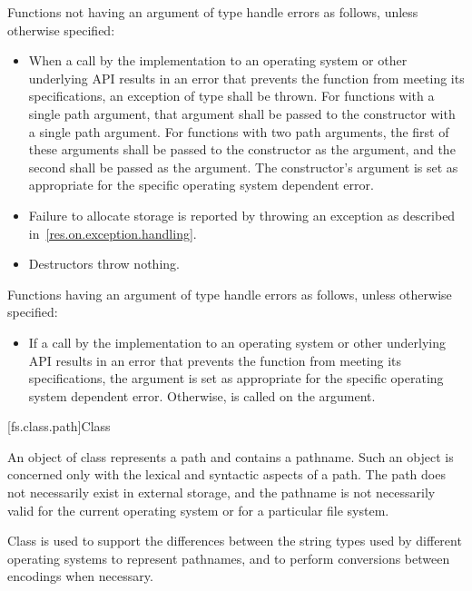 \pnum
Functions not having an argument of type 
handle errors as follows, unless otherwise specified:
\begin{itemize}
\item When a call by the
  implementation to an operating system or other underlying API results in an
  error that prevents the function from meeting its specifications, an exception
  of type
 shall be thrown. For functions with a single path
  argument, that argument shall be passed to the
 constructor with a single path argument. For
  functions with two path arguments, the first of these arguments shall be
  passed to the
 constructor as the  argument,
  and the second shall be passed as the  argument. The
   constructor's  argument
  is set as appropriate for the specific operating system dependent error.
\item Failure to allocate storage is reported by throwing an exception
as described in~\ref{res.on.exception.handling}.
\item Destructors throw nothing.
\end{itemize}

\pnum
Functions having an argument of type 
handle errors as follows, unless otherwise specified:
\begin{itemize}
\item If a call by the
  implementation to an operating system or other underlying API results in an
  error that prevents the function from meeting its specifications, the
   argument is set as
  appropriate for the specific operating system dependent error. Otherwise, 
  is called on the
   argument.
\end{itemize}

[fs.class.path]{Class }

%
\pnum
An object of class  represents a path
and contains a pathname.
Such an object is concerned only with the lexical and syntactic aspects
of a path. The path does not necessarily exist in external storage, and the
pathname is not necessarily valid for the current operating
system or for a particular file system.

\pnum
\begin{note}
Class  is used to support the differences between the string types used by different operating systems to represent pathnames, and to perform conversions between encodings when necessary.
\end{note}

